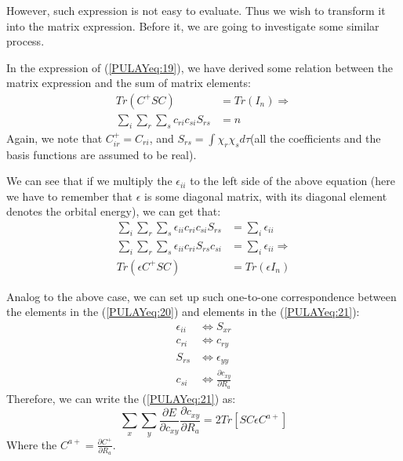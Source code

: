 However, such expression is not easy to evaluate. Thus we wish to
transform it into the matrix expression. Before it, we are going to
investigate some similar process.

In the expression of (\ref{PULAYeq:19}), we have derived some relation
between the matrix expression and the sum of matrix elements:
\begin{align}\label{}
  Tr(C^{+}SC) &=
  Tr(I_{n}) \Rightarrow \nonumber \\
  \sum_{i}\sum_{r}\sum_{s}c_{ri}c_{si}S_{rs} &= n
\end{align}
Again, we note that $C^{+}_{ir} = C_{ri}$, and $S_{rs} = \int
\chi_{r}\chi_{s}d\tau$(all the coefficients and the basis functions
are assumed to be real).

We can see that if we multiply the $\epsilon_{ii}$ to the left side of
the above equation (here we have to remember that $\epsilon$ is some
diagonal matrix, with its diagonal element denotes the orbital
energy), we can get that:
\begin{align}\label{PULAYeq:20}
  \sum_{i}\sum_{r}\sum_{s}\epsilon_{ii}c_{ri}c_{si}S_{rs}
  &= \sum_{i}\epsilon_{ii} \nonumber \\
  \sum_{i}\sum_{r}\sum_{s}\epsilon_{ii}c_{ri}S_{rs}c_{si}
  &= \sum_{i}\epsilon_{ii} \Rightarrow \nonumber \\
  Tr(\epsilon C^{+}SC) &= Tr(\epsilon I_{n})
\end{align}

Analog to the above case, we can set up such one-to-one correspondence
between the elements in the (\ref{PULAYeq:20}) and elements in the
(\ref{PULAYeq:21}):
\begin{equation}\label{}
  \begin{split}
    \epsilon_{ii} &\Leftrightarrow S_{xr}  \\
    c_{ri}        &\Leftrightarrow c_{ry}  \\
    S_{rs}        &\Leftrightarrow \epsilon_{yy}  \\
    c_{si} &\Leftrightarrow \frac{\partial c_{xy}}{\partial R_{a}}
  \end{split}
\end{equation}
Therefore, we can write the (\ref{PULAYeq:21}) as:
\begin{equation}\label{}
  \sum_{x}\sum_{y}\frac{\partial E}{\partial c_{xy}}\frac{\partial
    c_{xy}}{\partial R_{a}} = 2Tr[SC\epsilon C^{a+}]
\end{equation}
Where the $C^{a+} = \frac{\partial C^{+}}{\partial R_{a}}$.


